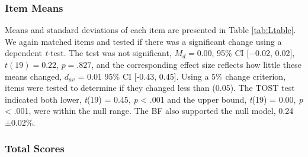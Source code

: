 \documentclass[english,man, mask]{apa6}
\theoremstyle{definition}
\theoremstyle{definition}
\theoremstyle{definition}
\theoremstyle{remark}
\begin{document}
\subsubsection{Item Means}\label{item-means-1}

Means and standard deviations of each item are presented in Table
\ref{tab:Ltable}. We again matched items and tested if there was a
significant change using a dependent \emph{t}-test. The test was not
significant, \(M_d = 0.00\), 95\% CI \([-0.02\), \(0.02]\),
\(t(19) = 0.22\), \(p = .827\), and the corresponding effect size
reflects how little these means changed, \(d_{av}\) = 0.01 95\% CI
{[}-0.43, 0.45{]}. Using a 5\% change criterion, items were tested to
determine if they changed less than (0.05). The TOST test indicated both
lower, \emph{t}(19) = 0.45, \emph{p} \textless{} .001 and the upper
bound, \emph{t}(19) = 0.00, \emph{p} \textless{} .001, were within the
null range. The BF also supported the null model, 0.24 ±0.02\%.

\subsubsection{Total Scores}\label{total-scores-1}
\end{document}
